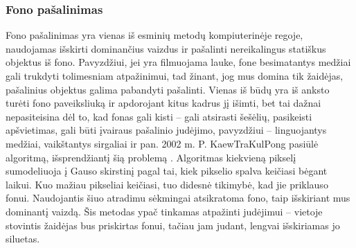 \documentclass{VUMIFPSbakalaurinis}
\begin{document}
\subsubsection{Fono pašalinimas}
Fono pašalinimas yra vienas iš esminių metodų kompiuterinėje regoje, naudojamas išskirti dominančius vaizdus ir pašalinti nereikalingus statiškus objektus iš fono. Pavyzdžiui, jei yra filmuojama lauke, fone besimatantys medžiai gali trukdyti tolimesniam atpažinimui, tad žinant, jog mus domina tik žaidėjas, pašalinius objektus galima pabandyti pašalinti. Vienas iš būdų yra iš anksto turėti fono paveiksliuką ir apdorojant kitus kadrus jį išimti, bet tai dažnai nepasiteisina dėl to, kad fonas gali kisti – gali atsirasti šešėlių, pasikeisti apšvietimas, gali būti įvairaus pašalinio judėjimo, pavyzdžiui – linguojantys medžiai, vaikštantys sirgaliai ir pan. 2002 m.  P. KaewTraKulPong pasiūlė algoritmą, išsprendžiantį šią problemą \cite{KaewTraKulPong2002}. Algoritmas kiekvieną pikselį sumodeliuoja į Gauso skirstinį pagal tai, kiek pikselio spalva keičiasi bėgant laikui. Kuo mažiau pikseliai keičiasi, tuo didesnė tikimybė, kad jie priklauso fonui. Naudojantis šiuo atradimu sėkmingai atsikratoma fono, taip išskiriant mus dominantį vaizdą. Šis metodas ypač tinkamas atpažinti judėjimui – vietoje stovintis žaidėjas bus priskirtas fonui, tačiau jam judant, lengvai išskiriamas jo siluetas.  
\end{document}
